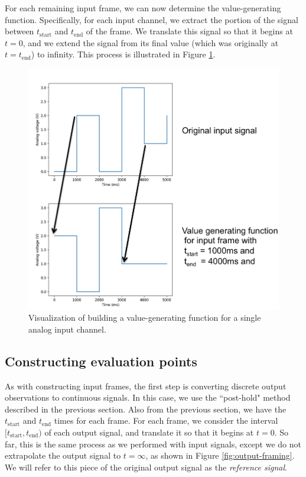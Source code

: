 \documentclass[12pt]{article}
\begin{document}
For each remaining input frame, we can now determine the value-generating function.  Specifically, for each input channel, we extract the portion of the signal between $t_{\text{start}}$ and $t_{\text{end}}$ of the frame.  We translate this signal so that it begins at $t=0$, and we extend the signal from its final value (which was originally at $t=t_{\text{end}}$) to infinity.  This process is illustrated in Figure \ref{fig:input-framing}.

\begin{figure}[ht]
\centering
\includegraphics[width=0.6\linewidth]{input-framing.png}
\caption{Visualization of building a value-generating function for a single analog input channel.}
\label{fig:input-framing}
\end{figure}

\subsection{Constructing evaluation points}
\label{sec:using-point-templates}
As with constructing input frames, the first step is converting discrete output observations to continuous signals.  In this case, we use the ``post-hold" method described in the previous section.  Also from the previous section, we have the $t_{\text{start}}$ and $t_{\text{end}}$ times for each frame.  For each frame, we consider the interval $[t_{\text{start}}, t_{\text{end}})$ of each output signal, and translate it so that it begins at $t=0$.  So far, this is the same process as we performed with input signals, except we do not extrapolate the output signal to $t=\infty$, as shown in Figure \ref{fig:output-framing}.  We will refer to this piece of the original output signal as the \textit{reference signal}.  
\end{document}
